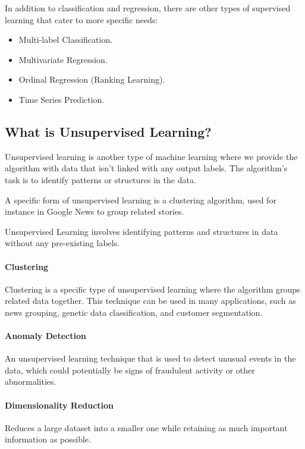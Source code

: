 \documentclass[a4paper]{article}
\begin{document}
    In addition to classification and regression, there are other types of supervised learning that cater to more specific needs: 
    \begin{itemize}
        \item Multi-label Classification.
        \item Multivariate Regression.
        \item Ordinal Regression (Ranking Learning).
        \item Time Series Prediction.
    \end{itemize}

    \subsection*{What is Unsupervised Learning?}
    Unsupervised learning is another type of machine learning where we provide the algorithm with data that isn't linked with any output labels. The algorithm's task is to identify patterns or structures in the data.

    A specific form of unsupervised learning is a clustering algorithm, used for instance in Google News to group related stories.

    \begin{center}
        \begin{YStkyNote}[Note]
                Unsupervised Learning involves identifying patterns and structures in data without any pre-existing labels.
        \end{YStkyNote}
    \end{center}
    
    \paragraph*{Clustering}
    Clustering is a specific type of unsupervised learning where the algorithm groups related data together. This technique can be used in many applications, such as news grouping, genetic data classification, and customer segmentation.

    \paragraph*{Anomaly Detection}
    An unsupervised learning technique that is used to detect unusual events in the data, which could potentially be signs of fraudulent activity or other abnormalities.

    \paragraph*{Dimensionality Reduction}
    Reduces a large dataset into a smaller one while retaining as much important information as possible.
    
\end{document}
